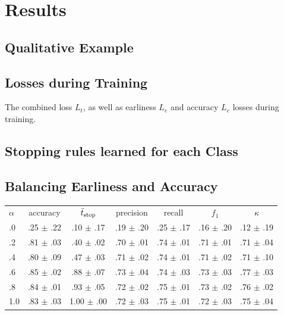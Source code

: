 \documentclass[a0]{tumposter}
\begin{document}
\begin{minipage}[t]{.32\textwidth}
	\section{Results}
	
	\subsection{Qualitative Example}
	
	
	
	\subsection{Losses during Training}
	
	\small
	
	The combined loss $L_t$, as well as earliness $L_e$ and accuracy $L_e$ losses during training.
	
	
	\figearlyreward
	
	\subsection{Stopping rules learned for each Class}
	
	
	
	\subsection{Balancing Earliness and Accuracy} \par
	\begin{table}
		
		\scriptsize
		\hspace{0em}\begin{tabular}{lcccccc}
			\toprule\small
			\textbf{$\alpha$} & accuracy & $\bar{t}_\text{stop}$  & precision & recall & $f_1$ & $\kappa$ \\
			\cmidrule(lr){0-0}\cmidrule(lr){1-1}\cmidrule(lr){2-2}\cmidrule(lr){3-3}\cmidrule(lr){4-4}\cmidrule(lr){5-5}\cmidrule(lr){6-6}\cmidrule(lr){7-7}
			.0 & .25 $\pm$ .22 & .10 $\pm$ .17 & .19 $\pm$ .20 & .25 $\pm$ .17 & .16 $\pm$ .20 & .12 $\pm$ .19 \\
			.2 & .81 $\pm$ .03 & .40 $\pm$ .02 & .70 $\pm$ .01 & .74 $\pm$ .01 & .71 $\pm$ .01 & .71 $\pm$ .04 \\
			.4 & .80 $\pm$ .09 & .47 $\pm$ .03 & .71 $\pm$ .02 & .74 $\pm$ .01 & .71 $\pm$ .02 & .71 $\pm$ .10 \\
			.6 & .85 $\pm$ .02 & .88 $\pm$ .07 & .73 $\pm$ .04 & .74 $\pm$ .03 & .73 $\pm$ .03 & .77 $\pm$ .03 \\
			.8 & .84 $\pm$ .01 & .93 $\pm$ .05 & .72 $\pm$ .02 & .75 $\pm$ .01 & .73 $\pm$ .02 & .76 $\pm$ .02 \\
			1.0 & .83 $\pm$ .03 & 1.00 $\pm$ .00 & .72 $\pm$ .03 & .75 $\pm$ .01 & .72 $\pm$ .03 & .75 $\pm$ .04 \\
			\bottomrule
		\end{tabular}
	

\end{table}
\end{minipage}
\end{document}
